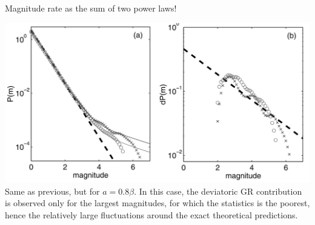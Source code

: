 \documentclass[aspectratio=43,9pt]{beamer}
\begin{document}
\begin{frame}
 {Magnitude rate as the sum of two power laws!}
 
   \includegraphics[width=1\linewidth]{Figs/fig8} \\
   Same as previous, but for $a = 0.8\beta$. In this case, the deviatoric GR 
   contribution is observed only for the largest magnitudes, for which the 
   statistics is the poorest, hence the relatively large fluctuations around the 
   exact theoretical predictions.

 
\end{frame}
\end{document}
